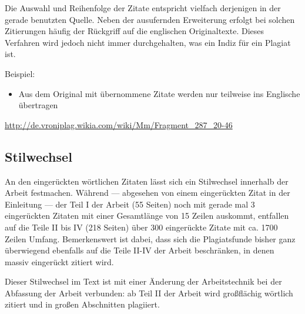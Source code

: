 \documentclass[ngerman,final,fontsize=12pt,paper=a4,twoside,bibliography=totoc,BCOR=8mm,draft=false]{scrartcl}
\begin{document}

Die Auswahl und Reihenfolge der Zitate entspricht vielfach derjenigen in der gerade benutzten Quelle. Neben der ausufernden Erweiterung erfolgt bei solchen Zitierungen häufig der Rückgriff auf die englischen Originaltexte. Dieses Verfahren wird jedoch nicht immer durchgehalten, was ein Indiz für ein Plagiat ist. 


Beispiel: 

\begin{itemize}
\item Aus dem Original mit übernommene Zitate werden nur teilweise ins Englische übertragen 
\end{itemize}
\begin{description}
\item %
\begin{description}
\item  %
\url{http://de.vroniplag.wikia.com/wiki/Mm/Fragment_287_20-46} \end{description}
 \end{description}
\subsection{%
Stilwechsel}

An den eingerückten wörtlichen Zitaten lässt sich ein Stilwechsel innerhalb der Arbeit festmachen. Während --- abgesehen von einem eingerückten Zitat in der Einleitung --- der Teil I der Arbeit (55 Seiten) noch mit gerade mal 3 eingerückten Zitaten mit einer Gesamtlänge von 15 Zeilen auskommt, entfallen auf die Teile II bis IV (218 Seiten) über 300 eingerückte Zitate mit ca. 1700 Zeilen Umfang. Bemerkenswert ist dabei, dass sich die Plagiatsfunde bisher ganz überwiegend ebenfalls auf die Teile II-IV der Arbeit beschränken, in denen massiv eingerückt zitiert wird. 


Dieser Stilwechsel im Text ist mit einer Änderung der Arbeitstechnik bei der Abfassung der Arbeit verbunden: ab Teil II der Arbeit wird großflächig wörtlich zitiert und in großen Abschnitten plagiiert. 
\end{document}
